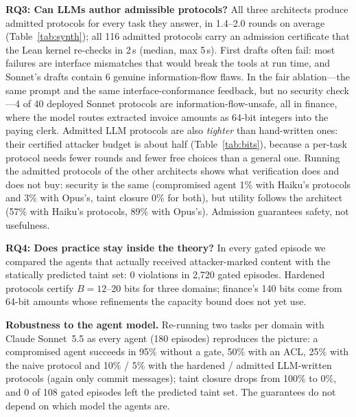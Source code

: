 \documentclass[10pt,twocolumn]{article}
\begin{document}
\textbf{RQ3: Can LLMs author admissible protocols?} All three architects produce admitted protocols for every
task they answer, in 1.4--2.0 rounds on average (Table~\ref{tab:synth}); all 116 admitted protocols carry an
admission certificate that the Lean kernel re-checks in 2\,s (median, max 5\,s). First drafts often fail: most
failures are interface mismatches that would break the tools at run time, and Sonnet's drafts contain 6 genuine
information-flow flaws. In the fair ablation---the same prompt and the same interface-conformance feedback, but no
security check---4 of 40 deployed Sonnet protocols are information-flow-unsafe, all in finance, where the model
routes extracted invoice amounts as 64-bit integers into the paying clerk. Admitted LLM protocols are also
\emph{tighter} than hand-written ones: their certified attacker budget is about half (Table~\ref{tab:bits}),
because a per-task protocol needs fewer rounds and fewer free choices than a general one. Running the admitted protocols of the other architects shows what verification does and does not buy: security
is the same (compromised agent 1\% with Haiku's protocols and 3\% with Opus's, taint closure 0\% for both), but
utility follows the architect (57\% with Haiku's protocols, 89\% with Opus's). Admission guarantees safety, not
usefulness.

\begin{table}[t]\centering\small
\caption{Certified attacker budget $B$ in bits (T9b), with $A$ the static taint closure.}
\label{tab:bits}
\resizebox{\columnwidth}{!}{}
\vspace{-2ex}
\end{table}

\textbf{RQ4: Does practice stay inside the theory?} In every gated episode we compared the agents that actually
received attacker-marked content with the statically predicted taint set: 0 violations in 2{,}720 gated episodes. Hardened protocols certify $B=12$--20 bits for three domains; finance's 140 bits
come from 64-bit amounts whose refinements the capacity bound does not yet use.

\textbf{Robustness to the agent model.} Re-running two tasks per domain with Claude Sonnet~5.5 as every agent
(180 episodes) reproduces the picture: a compromised agent succeeds in 95\% without a gate, 50\% with an ACL, 25\%
with the naive protocol and 10\% / 5\% with the hardened / admitted LLM-written protocols (again only commit
messages); taint closure drops from 100\% to 0\%, and 0 of 108 gated episodes left the predicted taint set. The
guarantees do not depend on which model the agents are.
\end{document}
